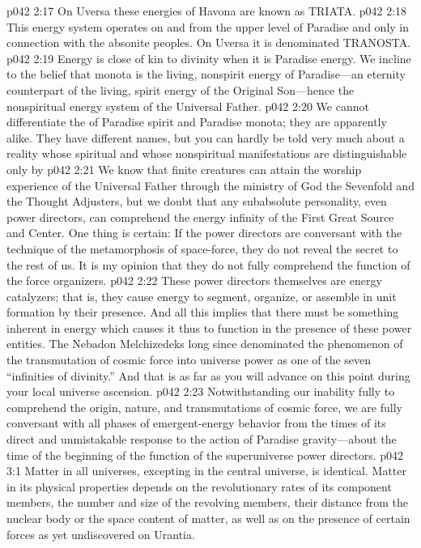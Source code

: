 \vs p042 2:17 On Uversa these energies of Havona are known as TRIATA.
\pc \vs p042 2:18 \bibnobreakspace {} This energy system operates on and from the upper level of Paradise and only in connection with the absonite peoples. On Uversa it is denominated TRANOSTA.
\pc \vs p042 2:19 \bibnobreakspace {} Energy is close of kin to divinity when it is Paradise energy. We incline to the belief that monota is the living, nonspirit energy of Paradise---an eternity counterpart of the living, spirit energy of the Original Son---hence the nonspiritual energy system of the Universal Father.\plusone
\vs p042 2:20 We cannot differentiate the  of Paradise spirit and Paradise monota; they are apparently alike. They have different names, but you can hardly be told very much about a reality whose spiritual and whose nonspiritual manifestations are distinguishable only by 
\pc \vs p042 2:21 We know that finite creatures can attain the worship experience of the Universal Father through the ministry of God the Sevenfold and the Thought Adjusters, but we doubt that any subabsolute personality, even power directors, can comprehend the energy infinity of the First Great Source and Center. One thing is certain: If the power directors are conversant with the technique of the metamorphosis of space\hyp{}force, they do not reveal the secret to the rest of us. It is my opinion that they do not fully comprehend the function of the force organizers.
\vs p042 2:22 These power directors themselves are energy catalyzers; that is, they cause energy to segment, organize, or assemble in unit formation by their presence. And all this implies that there must be something inherent in energy which causes it thus to function in the presence of these power entities. The Nebadon Melchizedeks long since denominated the phenomenon of the transmutation of cosmic force into universe power as one of the seven “infinities of divinity.” And that is as far as you will advance on this point during your local universe ascension.
\pc \vs p042 2:23 Notwithstanding our inability fully to comprehend the origin, nature, and transmutations of cosmic force, we are fully conversant with all phases of emergent\hyp{}energy behavior from the times of its direct and unmistakable response to the action of Paradise gravity---about the time of the beginning of the function of the superuniverse power directors.
\vs p042 3:1 Matter in all universes, excepting in the central universe, is identical. Matter in its physical properties depends on the revolutionary rates of its component members, the number and size of the revolving members, their distance from the nuclear body or the space content of matter, as well as on the presence of certain forces as yet undiscovered on Urantia.
